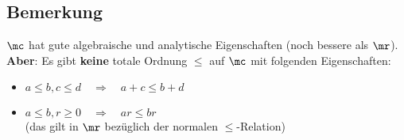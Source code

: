 \subsection{Bemerkung}
	$\mc$ hat gute algebraische und analytische Eigenschaften (noch bessere als $\mr$).\\
	\textbf{Aber}: Es gibt \textbf{keine} totale Ordnung $\leq$ auf $\mc$ mit folgenden Eigenschaften:
	\begin{itemize}
		\item $a\leq b, c\leq d \quad \Rightarrow \quad a+c\leq b+d$
		\item $a\leq b, r\geq 0 \quad \Rightarrow \quad ar\leq br$\\
			(das gilt in $\mr$ bezüglich der normalen $\leq$-Relation)
	\end{itemize}